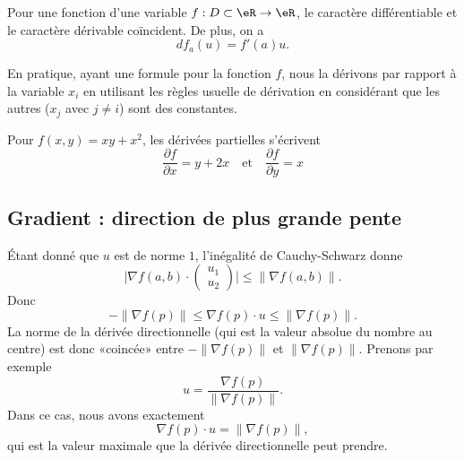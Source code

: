 \begin{lemma}       \label{LEMooTPDSooGbxfhP}
	Pour une fonction d'une variable \( f : D \subset \eR \to \eR\), le caractère différentiable et le caractère dérivable coïncident. De plus, on a
	\begin{equation}
		d f_a(u) = f'(a) u.
	\end{equation}
\end{lemma}

\begin{normaltext} \label{deriveepartielles}
	En pratique, ayant une formule pour la fonction \( f\), nous la dérivons par rapport à la variable \( x_i\) en utilisant les règles usuelle de dérivation en considérant que les autres (\( x_j\) avec \( j \neq i\)) sont des constantes.
\end{normaltext}

\begin{example}
	Pour \( f(x,y) = xy + x^2\), les dérivées partielles
	s'écrivent
	\begin{equation*}
		\frac{\partial f}{\partial x} = y + 2x \quad\text{et}\quad \frac{\partial f}{\partial y} = x
	\end{equation*}
\end{example}

\subsection{Gradient : direction de plus grande pente}

Étant donné que \( u\) est de norme \( 1\), l'inégalité de Cauchy-Schwarz donne
\begin{equation}
	\big| \nabla f(a,b)\cdot \begin{pmatrix}
		u_1 \\
		u_2
	\end{pmatrix}\big|\leq \| \nabla f(a,b) \|.
\end{equation}
Donc
\begin{equation}
	-\| \nabla f(p) \|\leq \nabla f(p)\cdot u\leq\| \nabla f(p) \|.
\end{equation}
La norme de la dérivée directionnelle (qui est la valeur absolue du nombre au centre) est donc «coincée» entre \( -\| \nabla f(p) \|\) et \( \| \nabla f(p) \|\). Prenons par exemple
\begin{equation}
	u=\frac{ \nabla f(p) }{ \| \nabla f(p) \| }.
\end{equation}
Dans ce cas, nous avons exactement
\begin{equation}
	\nabla f(p)\cdot u=\| \nabla f(p) \|,
\end{equation}
qui est la valeur maximale que la dérivée directionnelle peut prendre.

